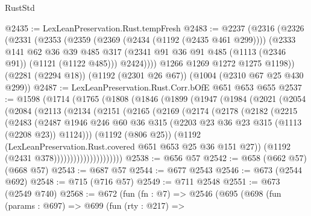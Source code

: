 \begin{lexlean}{RustStd}
\begin{coremodule}
@2435 := LexLeanPreservation.Rust.tempFresh
@2483 := @2237
    (@2316
      (@2326
        (@2331
          (@2353
            (@2359
              (@2369 (@2434 (@1192 (@2435 @461 @299))))
              (@2333
                @141
                @62
                @36
                @39
                @485
                @317
                (@2341 @91 @36 @91 @485 (@1113 (@2346 @91)) (@1121 (@1122 @485)))
                @2424))))
        @1266
        @1269
        @1272
        @1275
        @1198))
    (@2281 (@2294 @18))
    (@1192 (@2301 @26 @67))
    (@1004 (@2310 @67 @25 @430 @299))
@2487 := LexLeanPreservation.Rust.Corr.bOfE @651 @653 @655
@2537 := @1598
    (@1714
      (@1765
        (@1808
          (@1846
            (@1899
              (@1947
                (@1984
                  (@2021
                    (@2054
                      (@2084
                        (@2113
                          (@2134
                            (@2151
                              (@2165
                                (@2169
                                  (@2174
                                    (@2178
                                      (@2182
                                        (@2215
                                          (@2483
                                            (@2487
                                              @1946
                                              @246
                                              @60
                                              @36
                                              @315
                                              (@2203 @23 @36 @23 @315 (@1113 (@2208 @23)) @1124)))
                                          (@1192 (@806 @25))
                                          (@1192
                                            (LexLeanPreservation.Rust.covered
                                              @651
                                              @653
                                              @25
                                              @36
                                              @151
                                              @27))
                                          (@1192 (@2431 @378)))))))))))))))))))))
@2538 := @656 @57
@2542 := @658 (@662 @57) (@668 @57)
@2543 := @687 @57
@2544 := @677 @2543
@2546 := @673 (@2544 @692)
@2548 := @715 (@716 @57)
@2549 := @711 @2548
@2551 := @673 (@2549 @740)
@2568 := @672
    (fun (fn : @7) =>
    @2546
      (@695
        (@698
          (fun (params : @697) =>
          @699
            (fun (rty : @217) =>

\end{coremodule}
\end{lexlean}
